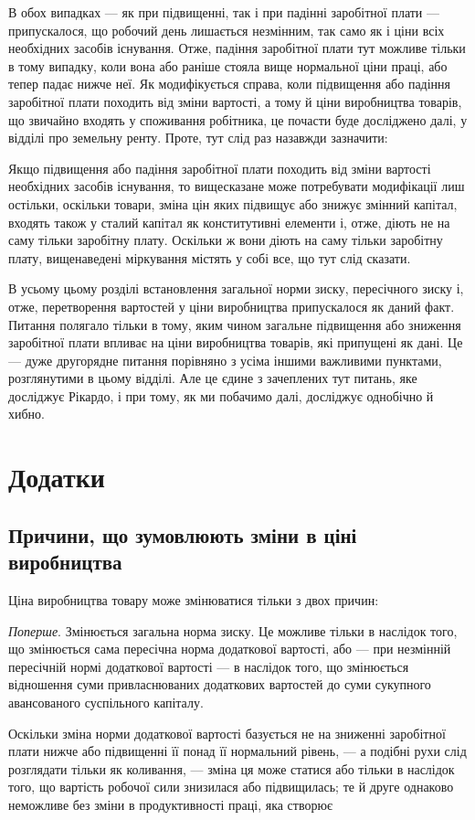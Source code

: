 \parcont{}  %
В обох випадках — як при підвищенні, так і при падінні заробітної плати — припускалося, що робочий
день лишається незмінним, так само як і ціни всіх необхідних засобів існування. Отже, падіння
заробітної плати тут можливе тільки в тому випадку, коли вона або раніше стояла вище нормальної ціни
праці, або тепер падає нижче неї. Як модифікується справа, коли підвищення або падіння заробітної
плати походить від зміни вартості, а тому й ціни виробництва товарів, що звичайно входять у
споживання робітника, це почасти буде досліджено далі, у відділі про земельну ренту. Проте, тут слід
раз назавжди зазначити:

Якщо підвищення або падіння заробітної плати походить від зміни вартості необхідних засобів
існування, то вищесказане може потребувати модифікації лиш остільки, оскільки товари, зміна цін яких
підвищує або знижує змінний капітал, входять також у сталий капітал як конститутивні елементи і,
отже, діють не на саму тільки заробітну плату. Оскільки ж вони діють на саму тільки заробітну плату,
вищенаведені міркування містять у собі все, що тут слід сказати.

В усьому цьому розділі встановлення загальної норми зиску, пересічного зиску і, отже, перетворення
вартостей у ціни виробництва припускалося як даний факт. Питання полягало тільки в тому, яким чином
загальне підвищення або зниження заробітної плати впливає на ціни виробництва товарів, які припущені
як дані. Це — дуже другорядне питання порівняно з усіма іншими важливими пунктами, розглянутими в
цьому відділі. Але
це єдине з зачеплених тут питань, яке досліджує Рікардо, і при тому, як ми побачимо далі, досліджує
однобічно й хибно.

\section{Додатки}

\subsection{Причини, що зумовлюють зміни в ціні виробництва}

Ціна виробництва товару може змінюватися тільки з двох причин:

\emph{Поперше}. Змінюється загальна норма зиску. Це можливе тільки в наслідок того, що змінюється сама
пересічна норма додаткової вартості, або — при незмінній пересічній нормі додаткової вартості — в
наслідок того, що змінюється відношення суми привласнюваних додаткових вартостей до суми сукупного
авансованого суспільного капіталу.

Оскільки зміна норми додаткової вартості базується не на зниженні заробітної плати нижче або
підвищенні її понад її нормальний рівень, — а подібні рухи слід розглядати тільки як коливання, —
зміна ця може статися або тільки в наслідок того, що вартість робочої сили знизилася або
підвищилась; те й друге однаково неможливе без зміни в продуктивності праці, яка створює
\parbreak{}  %

